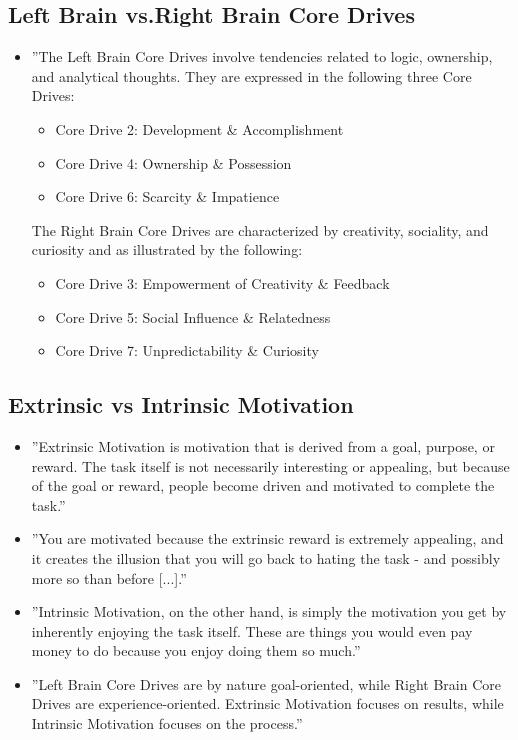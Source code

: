 \subsection{Left Brain vs.Right Brain Core Drives}
\begin{itemize}
    \item ''The Left Brain Core Drives involve tendencies related to logic, ownership, and analytical thoughts. They are expressed in the following three Core Drives:
    \begin{itemize}
        \item Core Drive 2: Development \& Accomplishment
        \item Core Drive 4: Ownership \& Possession
        \item Core Drive 6: Scarcity \& Impatience
    \end{itemize}
    The Right Brain Core Drives are characterized by creativity, sociality, and curiosity and as illustrated by the following:
    \begin{itemize}
        \item Core Drive 3: Empowerment of Creativity \& Feedback
        \item Core Drive 5: Social Influence \& Relatedness
        \item Core Drive 7: Unpredictability \& Curiosity
    \end{itemize}
\end{itemize}

\subsection{Extrinsic vs Intrinsic Motivation}
\begin{itemize}
    \item ''Extrinsic Motivation is motivation that is derived from a goal, purpose, or reward. The task itself is not necessarily interesting or appealing, but because of the goal or reward, people become driven and motivated to complete the task.''
    \item ''You are motivated because the extrinsic reward is extremely appealing, and it creates the illusion that you will go back to hating the task - and possibly more so than before [...].''
    \item ''Intrinsic Motivation, on the other hand, is simply the motivation you get by inherently enjoying the task itself. These are things you would even pay money to do because you enjoy doing them so much.''
    \item ''Left Brain Core Drives are by nature goal-oriented, while Right Brain Core Drives are experience-oriented. Extrinsic Motivation focuses on results, while Intrinsic Motivation focuses on the process.''
\end{itemize}

